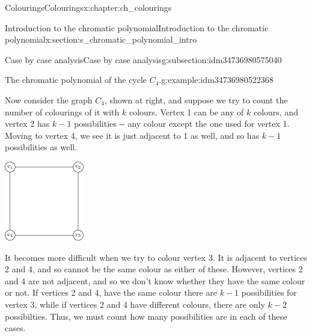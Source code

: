 \documentclass[oneside,10pt,]{book}
\numberwithin{equation}{section}
\begin{document}
\begin{chapterptx}{Colourings}{}{Colourings}{}{}{x:chapter:ch_colourings}
\begin{sectionptx}{Introduction to the chromatic polynomial}{}{Introduction to the chromatic polynomial}{}{}{x:section:s_chromatic_polynomial_intro}
\begin{subsectionptx}{Case by case analysis}{}{Case by case analysis}{}{}{g:subsection:idm34736980575040}
\begin{example}{The chromatic polynomial of the cycle \(C_4\).}{g:example:idm34736980522368}
\begin{sidebyside}{2}{0.025}{0.025}{0.05}
\begin{sbspanel}{0.6}
Now consider the graph \(C_4\), shown at right, and suppose we try to count the number of colourings of it with \(k\) colours.  Vertex 1 can be any of \(k\) colours, and vertex 2 has \(k-1\) possibilities -{}-{} any colour except the one used for vertex 1.  Moving to vertex 4, we see it is just adjacent to 1 as well, and so has \(k-1\) possibilities as well.%
\end{sbspanel}%
\begin{sbspanel}{0.3}%
\includegraphics[width=\linewidth]{images/c4.png}
\end{sbspanel}%
\end{sidebyside}%
It becomes more difficult when we try to colour vertex 3.  It is adjacent to vertices 2 and 4, and so cannot be the same colour as either of these.  However, vertices 2 and 4 are not adjacent, and so we don't know whether they have the same colour or not.  If vertices 2 and 4, have the same colour there are \(k-1\) possibilities for vertex 3, while if vertices 2 and 4 have different colours, there are only \(k-2\) possibilties.  Thus, we must count how many possibilities are in each of these cases.%
\par

\end{example}
\end{subsectionptx}
\end{sectionptx}
\end{chapterptx}
\end{document}
